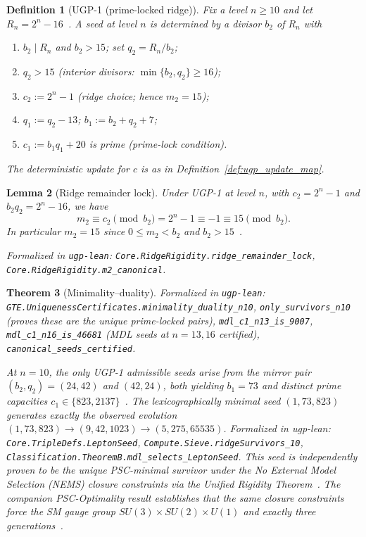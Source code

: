 \documentclass[12pt]{article}
\newtheorem{theorem}{Theorem}[section]
\newtheorem{lemma}[theorem]{Lemma}
\newtheorem{definition}[theorem]{Definition}
\numberwithin{equation}{section}
\begin{document}
\begin{definition}[UGP-1 (prime-locked ridge)]\label{def:UGP1-ridge}
Fix a level $n\ge 10$ and let $R_n=2^n-16$~\cite{SpivackUGPFormalization,ugp-lean}. A seed at level $n$ is determined by a divisor $b_2$ of $R_n$ with
\begin{enumerate}[label=(\Alph*), itemsep=2pt]
\item \label{def:q2} $b_2\mid R_n$ and $b_2>15$; set $q_2=R_n/b_2$;
\item $q_2>15$ (interior divisors: $\min\{b_2,q_2\} \ge 16$);
\item $c_2 := 2^n - 1$ (ridge choice; hence $m_2 = 15$);
\item \label{def:b1} $q_1 := q_2 - 13$; \quad $b_1 := b_2 + q_2 + 7$;
\item \label{def:prime} $c_1 := b_1 q_1 + 20$ is prime (prime-lock condition).
\end{enumerate}
The deterministic update for $c$ is as in Definition~\ref{def:ugp_update_map}.
\end{definition}

\begin{lemma}[Ridge remainder lock]\label{lem:m2}
Under UGP-1 at level $n$, with $c_2=2^n-1$ and $b_2 q_2=2^n-16$, we have
\[
m_2 \equiv c_2 \pmod{b_2} = 2^n-1 \equiv -1 \equiv 15 \pmod{b_2}.
\]
In particular $m_2=15$ since $0\le m_2<b_2$ and $b_2>15$~\cite{SpivackUGPFormalization,ugp-lean}.

\noindent\emph{Formalized in} \texttt{ugp-lean}: \texttt{Core.RidgeRigidity.ridge\_remainder\_lock}, \texttt{Core.RidgeRigidity.m2\_canonical}.
\end{lemma}

\begin{theorem}[Minimality--duality]\label{thm:minimality-duality}
\noindent\emph{Formalized in} \texttt{ugp-lean}: \texttt{GTE.UniquenessCertificates.minimality\_duality\_n10}, \texttt{only\_survivors\_n10} (proves these are the \emph{unique} prime-locked pairs), \texttt{mdl\_c1\_n13\_is\_9007}, \texttt{mdl\_c1\_n16\_is\_46681} (MDL seeds at $n=13,16$ certified), \texttt{canonical\_seeds\_certified}.

At $n=10$, the only UGP-1 admissible seeds arise from the mirror pair $(b_2,q_2)=(24,42)$ and $(42,24)$, both yielding $b_1=73$ and distinct prime capacities $c_1\in\{823,2137\}$~\cite{SpivackUGPFormalization,ugp-lean}. The lexicographically minimal seed $(1,73,823)$ generates exactly the observed evolution $(1,73,823)\to(9,42,1023)\to(5,275,65535)$. Formalized in ugp-lean: \texttt{Core.TripleDefs.LeptonSeed}, \texttt{Compute.Sieve.ridgeSurvivors\_10}, \texttt{Classification.TheoremB.mdl\_selects\_LeptonSeed}. This seed is independently proven to be the unique PSC-minimal survivor under the No External Model Selection (NEMS) closure constraints via the Unified Rigidity Theorem~\cite{SpivackUnifiedRigidity,SpivackNEMSHub}. The companion PSC-Optimality result establishes that the same closure constraints force the SM gauge group $SU(3)\times SU(2)\times U(1)$ and exactly three generations~\cite{SpivackNEMS05}.
\end{theorem}
\end{document}
